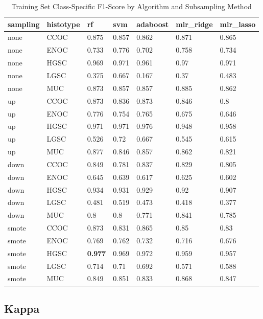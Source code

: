 \documentclass[
]{report}
\begin{document}
\begin{table}

\caption{\label{tab:train-f1-class-table}Training Set Class-Specific F1-Score by Algorithm and Subsampling Method}
\centering
\begin{tabular}[t]{l|l|l|l|l|l|l}
\hline
sampling & histotype & rf & svm & adaboost & mlr\_ridge & mlr\_lasso\\
\hline
none & CCOC & 0.875 & 0.857 & 0.862 & 0.871 & 0.865\\
\hline
none & ENOC & 0.733 & 0.776 & 0.702 & 0.758 & 0.734\\
\hline
none & HGSC & 0.969 & 0.971 & 0.961 & 0.97 & 0.971\\
\hline
none & LGSC & 0.375 & 0.667 & 0.167 & 0.37 & 0.483\\
\hline
none & MUC & 0.873 & 0.857 & 0.857 & 0.885 & 0.862\\
\hline
up & CCOC & 0.873 & 0.836 & 0.873 & 0.846 & 0.8\\
\hline
up & ENOC & 0.776 & 0.754 & 0.765 & 0.675 & 0.646\\
\hline
up & HGSC & 0.971 & 0.971 & 0.976 & 0.948 & 0.958\\
\hline
up & LGSC & 0.526 & 0.72 & 0.667 & 0.545 & 0.615\\
\hline
up & MUC & 0.877 & 0.846 & 0.857 & 0.862 & 0.821\\
\hline
down & CCOC & 0.849 & 0.781 & 0.837 & 0.829 & 0.805\\
\hline
down & ENOC & 0.645 & 0.639 & 0.617 & 0.625 & 0.602\\
\hline
down & HGSC & 0.934 & 0.931 & 0.929 & 0.92 & 0.907\\
\hline
down & LGSC & 0.481 & 0.519 & 0.473 & 0.418 & 0.377\\
\hline
down & MUC & 0.8 & 0.8 & 0.771 & 0.841 & 0.785\\
\hline
smote & CCOC & 0.873 & 0.831 & 0.865 & 0.85 & 0.83\\
\hline
smote & ENOC & 0.769 & 0.762 & 0.732 & 0.716 & 0.676\\
\hline
smote & HGSC & \textbf{0.977} & 0.969 & 0.972 & 0.959 & 0.957\\
\hline
smote & LGSC & 0.714 & 0.71 & 0.692 & 0.571 & 0.588\\
\hline
smote & MUC & 0.849 & 0.851 & 0.833 & 0.868 & 0.847\\
\hline
\end{tabular}
\end{table}

\hypertarget{kappa}{%
\subsection{Kappa}\label{kappa}}
\end{document}
